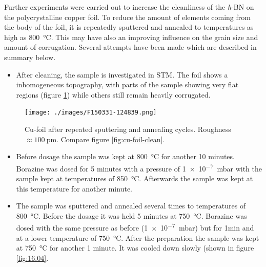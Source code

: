 Further experiments were carried out to increase the cleanliness of the \textit{h}-BN on the polycrystalline copper foil. To reduce the amount of elements coming from the body of the foil, it is repeatedly sputtered and annealed to temperatures as high as \SI{800}{\degreeCelsius}. This may have also an improving influence on the grain size and amount of corrugation. Several attempts have been made which are described in summary below.
\begin{itemize}
 \item After cleaning, the sample is investigated in STM. The foil shows a inhomogeneous topography, with parts of the sample showing very flat regions (figure \ref{fig:30-31.03}) while others still remain heavily corrugated.
\end{itemize}
\begin{figure}[h!]
 \centering
 \texttt{[image: ./images/F150331-124839.png]}
 \caption{Cu-foil after repeated sputtering and annealing cycles. Roughness $\approx \SI{100}{\pico\meter}$. Compare figure \ref{fig:cu-foil-clean}.}
 \label{fig:30-31.03}
\end{figure}
\begin{itemize}
 \item Before dosage the sample was kept at \SI{800}{\degreeCelsius} for another 10 minutes.
Borazine was dosed for 5 minutes with a pressure of \SI{1e-7}{\milli \bar} with the sample kept at temperatures of \SI{850}{\degreeCelsius}. Afterwards the sample was kept at this temperature for another minute.
\end{itemize}
\begin{itemize}
 \item The sample was sputtered and annealed several times to temperatures of \SI{800}{\degreeCelsius}. Before the dosage it was held 5 minutes at \SI{750}{\degreeCelsius}. Borazine was dosed with the same pressure as before (\SI{1e-7}{\milli \bar}) but for 1min and at a lower temperature of \SI{750}{\degreeCelsius}. After the preparation the sample was kept at \SI{750}{\degreeCelsius} for another 1 minute. It was cooled down slowly (shown in figure \ref{fig:16.04}.
\end{itemize}

